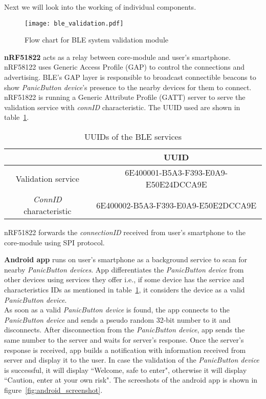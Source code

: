 Next we will look into the working of individual components.
\begin{figure}[H]
\centering
\texttt{[image: ble\_validation.pdf]}
\caption{Flow chart for BLE system validation module}
\label{fig:ble_validation}
\end{figure}
\textbf{nRF51822}
acts as a relay between core-module and user's smartphone. nRF58122 uses Generic Access Profile (GAP) to control the connections and advertising. BLE's GAP layer is responsible to broadcast connectible beacons to show \emph{PanicButton device}'s presence to the nearby devices for them to connect.\\
nRF51822 is running a Generic Attribute Profile (GATT) server to serve the validation service with \emph{connID} characteristic. The UUID used are shown in table~\ref{tab:Ids}.

\begin{table}[H]
\begin{center}
\begin{tabular}{ |c|c| } 
 \hline
 \textbf{} & \textbf{UUID}\\
 \hline 
 \hline
  Validation service & 6E400001-B5A3-F393-E0A9-E50E24DCCA9E\\ 
 \hline
 \emph{ConnID} characteristic & 6E400002-B5A3-F393-E0A9-E50E2DCCA9E \\ 
 \hline
\end{tabular}
\end{center}
\caption{UUIDs of the BLE services} 
\label{tab:Ids}
\end{table}

nRF51822 forwards the \emph{connectionID} received from user's smartphone  to the core-module using SPI protocol.

\textbf{Android app} runs on user's smartphone as a background service to scan for nearby \emph{PanicButton devices}. App differentiates the \emph{PanicButton device} from other devices using services they offer i.e., if some device has the service and characteristics IDs as mentioned in table~\ref{tab:Ids}, it considers the device as a valid \emph{PanicButton device}.\\
As soon as a valid \emph{PanicButton device} is found, the app connects to the \emph{PanicButton device} and sends a pseudo random 32-bit number to it and disconnects. After disconnection from the \emph{PanicButton device}, app sends the same number to the server and waits for server's response. Once the server's response is received, app builds a notification with information received from server and display it to the user. In case the validation of the \emph{PanicButton device} is successful, it will display ``Welcome, safe to enter", otherwise it will display ``Caution, enter at your own risk". The screeshots of the android app is shown in figure~\ref{fig:android_screenshot}. 

